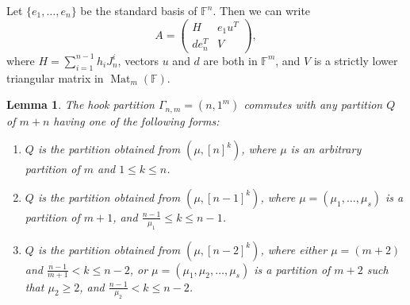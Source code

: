 \documentclass[11pt]{amsproc}
\newtheorem{lem}[thm]{Lemma}
\begin{document}
Let $\{e_1, \ldots, e_n\}$ be the standard basis of $\mathbb{F}^n$. Then we can write 
\begin{equation}\label{blocks of generic in U}
A=\left( 
\begin{array}{c|c}
  H   & e_1 u^T \\
  \hline
  d e_n^T   & V
\end{array}
\right),
\end{equation}
where $H=\sum\limits_{i=1}^{n-1}h_iJ_n^i$, vectors $u$ and $d$ are both in $\mathbb{F}^m$, and $V$ is a strictly lower triangular matrix in $\operatorname{Mat}_{m}(\mathbb{F})$.

\begin{lem}\label{commute with hook}
    The hook partition $\Gamma_{n,m}=\left(n,1^m\right)$ commutes with any partition $Q$ of $m+n$ having one of the following forms:
    \begin{enumerate}
        \item[(a)] $Q$ is the partition obtained from $\left(\mu, [n]^k\right)$, where $\mu$ is an arbitrary partition of $m$ and $1\leq k\leq n$.
        \item[(b)] $Q$ is the partition obtained from $\left(\mu,[n-1]^k\right)$, where $\mu=(\mu_1,\ldots, \mu_s)$ is a partition of $m+1$, and $\frac{n-1}{\mu_1}\leq k \leq n-1$.
        \item[(c)] $Q$ is the partition obtained from $\left(\mu, [n-2]^k\right)$, where either $\mu=(m+2)$ and $\frac{n-1}{m+1}< k \leq n-2$, or $\mu=(\mu_1, \mu_2, \ldots, \mu_s)$ is a partition of $m+2$ such that $\mu_2\geq 2$, and $\frac{n-1}{\mu_2}< k \leq n-2$.
        \end{enumerate}
\end{lem}
\end{document}
